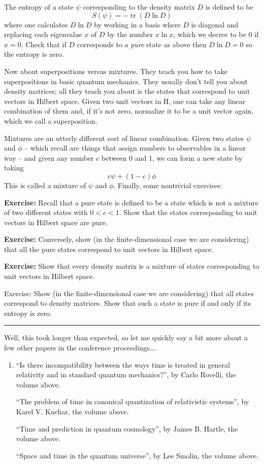 \documentclass{article}
\begin{document}
The entropy of a state \(\psi\) corresponding to the density matrix
\(D\) is defined to be \[S(\psi) = -\operatorname{tr}(D \ln D)\] where
one calculates \(D \ln D\) by working in a basis where \(D\) is diagonal
and replacing each eigenvalue \(x\) of \(D\) by the number \(x \ln x\),
which we decree to be \(0\) if \(x = 0\). Check that if \(D\)
corresponds to a \emph{pure} state as above then \(D \ln D = 0\) so the
entropy is zero.

Now about superpositions versus mixtures. They teach you how to take
superpositions in basic quantum mechanics. They usually don't tell you
about density matrices; all they teach you about is the states that
correspond to unit vectors in Hilbert space. Given two unit vectors in
H, one can take any linear combination of them and, if it's not zero,
normalize it to be a unit vector again, which we call a superposition.

Mixtures are an utterly different sort of linear combination. Given two
states \(\psi\) and \(\phi\) -- which recall are things that assign
numbers to observables in a linear way -- and given any number \(c\)
between \(0\) and \(1\), we can form a new state by taking
\[c \psi + (1-c) \phi\] This is called a mixture of \(\psi\) and
\(\phi\). Finally, some nontrivial exercises:

\textbf{Exercise:} Recall that a pure state is defined to be a state
which is not a mixture of two different states with \(0 < c < 1\). Show
that the states corresponding to unit vectors in Hilbert space are pure.

\textbf{Exercise:} Conversely, show (in the finite-dimensional case we
are considering) that all the pure states correspond to unit vectors in
Hilbert space.

\textbf{Exercise:} Show that every density matrix is a mixture of states
corresponding to unit vectors in Hilbert space.

Exercise: Show (in the finite-dimensional case we are considering) that
all states correspond to density matrices. Show that such a state is
pure if and only if its entropy is zero.

\begin{center}\rule{0.5\linewidth}{0.5pt}\end{center}

Well, this took longer than expected, so let me quickly say a bit more
about a few other papers in the conference proceedings\ldots.

\begin{enumerate}
\def\labelenumi{\arabic{enumi})}
\setcounter{enumi}{2}
\item
  ``Is there incompatibility between the ways time is treated in general
  relativity and in standard quantum mechanics?'', by Carlo Rovelli, the
  volume above.

  ``The problem of time in canonical quantization of relativistic
  systems'', by Karel V. Kuchar, the volume above.

  ``Time and prediction in quantum cosmology'', by James B. Hartle, the
  volume above.

  ``Space and time in the quantum universe'', by Lee Smolin, the volume
  above.
\end{enumerate}
\end{document}
